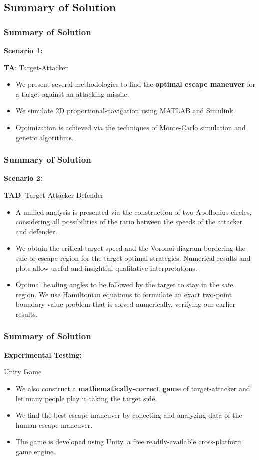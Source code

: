 \documentclass{beamer}
\begin{document}
\subsection{Summary of Solution} 

\begin{frame}
\frametitle{Summary of Solution}
\textbf{Scenario 1:}
\begin{block}{\textbf{TA}: Target-Attacker}
	\begin{itemize}
		\item We present several methodologies to find the \textbf{optimal escape maneuver} for a target against an attacking missile. 
		\item We simulate 2D proportional-navigation using MATLAB and Simulink.
		\item Optimization is achieved via the techniques of Monte-Carlo simulation and genetic algorithms.
	\end{itemize}
\end{block}
\end{frame}
\begin{frame}
\frametitle{Summary of Solution}
\textbf{Scenario 2:}
\begin{exampleblock}{\textbf{TAD}: Target-Attacker-Defender}
	\begin{itemize}
		\item A unified analysis is presented via the construction of two Apollonius circles, considering all possibilities of the ratio between the speeds of the attacker and defender. 
		\item We obtain the critical target speed and the Voronoi diagram bordering the safe or escape region for the target optimal strategies. Numerical results and plots allow useful and insightful qualitative interpretations. 
		\item Optimal heading angles to be followed by the target to stay in the safe region. We use Hamiltonian equations to formulate an exact two-point boundary value problem that is solved numerically, verifying our earlier results.
	\end{itemize}
\end{exampleblock}
\end{frame}
\begin{frame}
\frametitle{Summary of Solution}
\textbf{Experimental Testing:}
\begin{alertblock}{Unity Game}
	\begin{itemize}
		\item We also construct a \textbf{mathematically-correct game} of target-attacker and let many people play it taking the target side. 
		\item We find the best escape maneuver by collecting and analyzing data of the human escape maneuver. 
		\item The game is developed using Unity, a free readily-available cross-platform game engine.
	\end{itemize}
\end{alertblock}
\end{frame}
\end{document}
